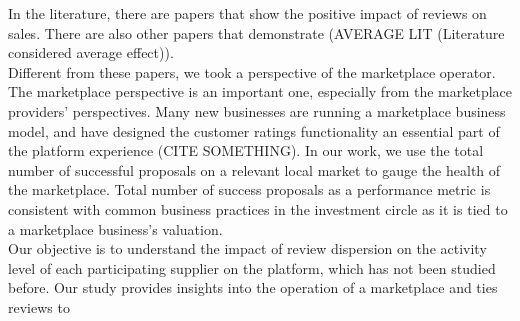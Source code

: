 \documentclass[msom,blindrev]{informs3}
\begin{document}
In the literature, there are papers that show the positive impact of reviews on sales. There are also other papers that demonstrate  (AVERAGE LIT (Literature considered average effect)).\\




Different from these papers, we took a perspective of the marketplace operator. The marketplace perspective is an important one, especially from the marketplace providers' perspectives. Many new businesses are running a marketplace business model, and have designed the customer ratings functionality an essential part of the platform experience (CITE SOMETHING). In our work, we use the total number of successful proposals on a relevant local market to gauge the health of the marketplace. Total number of success proposals as a performance metric is consistent with common business practices in the investment circle \citep{boris_2018,galston_2017} as it is tied to a marketplace business's valuation. \\

Our objective is to understand the impact of review dispersion on the activity level of each participating supplier on the platform, which has not been studied before. Our study provides insights into the operation of a marketplace and ties reviews to
\end{document}
